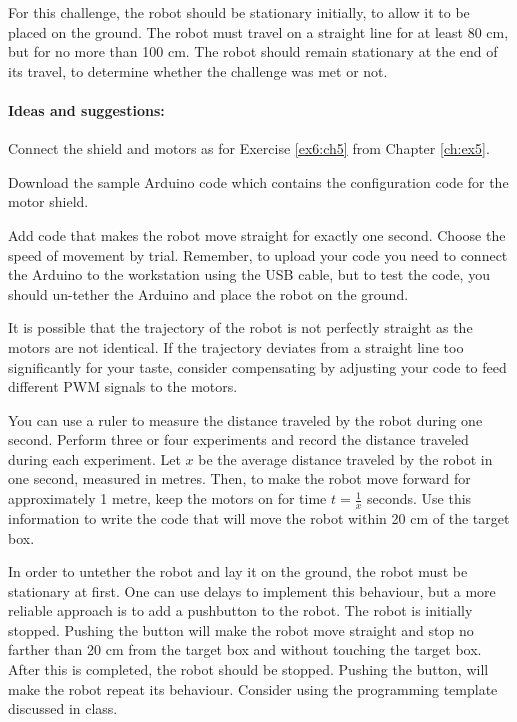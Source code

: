 \documentclass[12pt]{book}
\begin{document}
For this challenge, the robot should be stationary initially, to allow it to be placed on the ground. The robot must travel on
a straight line for at least 80 cm, but for no more than 100 cm. The
robot should remain stationary at the end of its travel, to determine
whether the challenge was met or not.


\paragraph{Ideas and suggestions:}

\begin{compactenum}[1)]
\item Connect the shield and motors as for Exercise \ref*{ex6:ch5}
  from Chapter
  \ref*{ch:ex5}. 
\item Download the sample Arduino code which contains the
  configuration code for the motor shield. 
\item Add code that makes the robot move straight for exactly one
  second. Choose the speed of movement by trial. Remember, to upload
  your code you need to connect the Arduino to the workstation using
  the USB cable, but to test the code, you should un-tether the
  Arduino and place the robot on the ground.

\item  It is possible that
  the trajectory of the robot is not perfectly straight as the motors
  are not identical. If the trajectory deviates from a straight line
  too significantly for your taste, consider compensating by adjusting
  your code to feed different PWM signals to the motors. 

\item You can use a ruler to measure the distance traveled by the robot
  during one second. Perform three or four experiments and record the
  distance traveled during each experiment. Let $x$ be the average
  distance traveled by the robot in one second, measured in
  metres. Then, to make the robot move forward for approximately 1 metre,
  keep the motors on for time $t=\frac{1}{x}$ seconds. Use this information to
  write the code that will move the robot within 20 cm of the target box.

\item In order to untether the robot and lay it on the ground, the robot must be stationary at first. One can use
  delays to implement this behaviour, but a more reliable approach is
  to add a pushbutton to the robot. The robot is initially
  stopped. Pushing the button will make the robot move straight 
  and stop no farther than 20 cm
from the target box and without touching the target box.
  After this is completed, the robot should be
  stopped. Pushing the button, will make the robot repeat its
  behaviour. Consider using the programming template discussed in class.
\end{compactenum}
\end{document}
